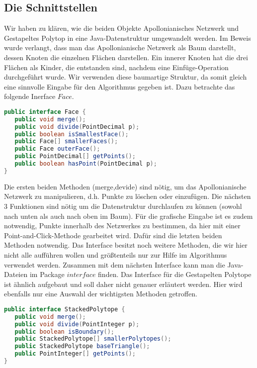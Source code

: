 \subsection*{Die Schnittstellen}
Wir haben zu klären, wie die beiden Objekte Apollonianisches Netzwerk und Gestapeltes Polytop in eine Java-Datenstruktur umgewandelt werden. Im Beweis wurde verlangt, dass man das Apollonianische Netzwerk als Baum darstellt, dessen Knoten die einzelnen Flächen darstellen. Ein innerer Knoten hat die drei Flächen als Kinder, die entstanden sind, nachdem eine Einfüge-Operation durchgeführt wurde. Wir verwenden diese baumartige Struktur, da somit gleich eine sinnvolle Eingabe für den Algorithmus gegeben ist. Dazu betrachte das folgende Inerface $Face$.

\begin{lstlisting}[language=Java, caption={Ausschnitt aus dem Face-Interface}]
public interface Face {
   public void merge();
   public void divide(PointDecimal p);
   public boolean isSmallestFace();
   public Face[] smallerFaces();
   public Face outerFace();
   public PointDecimal[] getPoints();
   public boolean hasPoint(PointDecimal p);
}
\end{lstlisting}

Die ersten beiden Methoden (merge,devide) sind nötig, um das Apollonianische Netzwerk zu manipulieren, d.h. Punkte zu löschen oder einzufügen. Die nächsten 3 Funktionen sind nötig um die Datenstruktur durchlaufen zu können (sowohl nach unten als auch nach oben im Baum). Für die grafische Eingabe ist es zudem notwendig, Punkte innerhalb des Netzwerkes zu bestimmen, da hier mit einer Point-and-Click-Methode gearbeitet wird. Dafür sind die letzten beiden Methoden notwendig. Das Interface besitzt noch weitere Methoden, die wir hier nicht alle aufführen wollen und größtenteils nur zur Hilfe im Algorithmus verwendet werden. Zusammen mit dem nächsten Interface kann man die Java-Dateien im Package $interface$ finden. Das Interface für die Gestapelten Polytope ist ähnlich aufgebaut und soll daher nicht genauer erläutert werden. Hier wird ebenfalls nur eine Auswahl der wichtigsten Methoden getroffen.

\begin{lstlisting}[language=Java, caption={Ausschnitt aus dem StackedPolytope-Interface}]
public interface StackedPolytope {
   public void merge();
   public void divide(PointInteger p);
   public boolean isBoundary();
   public StackedPolytope[] smallerPolytopes();
   public StackedPolytope baseTriangle();
   public PointInteger[] getPoints();
}
\end{lstlisting}

